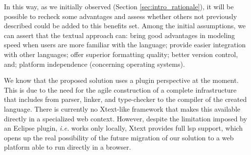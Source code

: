 
In this way, as we initially observed (Section \ref{sec:intro_rationale}), it will be possible to recheck some advantages and assess whether others not previously described could be added to this benefits set.
Among the initial assumptions, we can assert that the textual approach can: bring good advantages in modeling speed when users are more familiar with the language; provide easier integration with other languages; offer superior formatting quality; better version control, and; platform independence (concerning operating systems).

We know that the proposed solution uses a plugin perspective at the moment.
This is due to the need for the agile construction of a complete infrastructure that includes from parser, linker, and type-checker to the compiler of the created language.
There is currently no Xtext-like framework that makes this available directly in a specialized web context.
However, despite the limitation imposed by an Eclipse plugin,\textit{ i.e.} works only locally, Xtext provides full \ac{lsp} support, which opens up the real possibility of the future migration of our solution to a web platform able to run directly in a browser.

